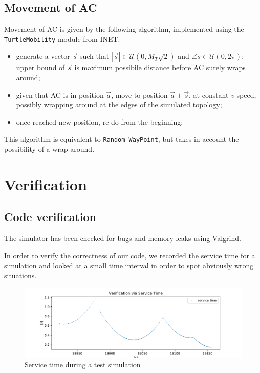 \documentclass[a4paper,12pt]{article}
\begin{document}
\subsection{Movement of AC}
Movement of AC is given by the following algorithm, implemented using the \texttt{TurtleMobility} module from INET:
\begin{itemize}
  \item generate a vector $\vec{s}$ such that $|\vec{s}| \in \mathcal{U}(0, M_{T}\sqrt{2})$ and $\angle{s} \in \mathcal{U}(0, 2\pi)$; upper bound of $\vec{s}$ is maximum possibile distance before AC surely wraps around;
  \item given that AC is in position $\vec{a}$, move to position $\vec{a} + \vec{s}$, at constant $v$ speed, possibly wrapping around at the edges of the simulated topology;
  \item once reached new position, re-do from the beginning;
\end{itemize}

This algorithm is equivalent to \texttt{Random WayPoint}, but takes in account the possibility of a wrap around.

\section{Verification}
\subsection{Code verification}
The simulator has been checked for bugs and memory leaks using Valgrind.

In order to verify the correctness of our code, we recorded the service time for a simulation and looked at a small time interval in order to spot abviously wrong situations.

\begin{figure}[H]
  \centering
  \includegraphics[width=\textwidth]{img/verification-via-service-time.pdf}
  \caption{Service time during a test simulation}
  \label{fig:verification-via-service-time}
\end{figure}
\end{document}
